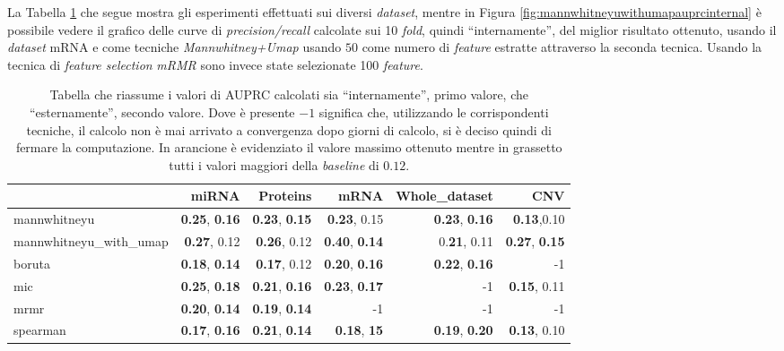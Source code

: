 \documentclass[12pt,italian]{report}
\begin{document}
	La Tabella \ref{firstExperiments} che segue mostra gli esperimenti effettuati sui diversi \textit{dataset}, mentre in Figura \ref{fig:mannwhitneyuwithumapauprcinternal} è possibile vedere il grafico delle curve di \textit{precision/recall} calcolate sui 10 \textit{fold}, quindi ``internamente'', del miglior risultato ottenuto, usando il \textit{dataset} mRNA e come tecniche \textit{Mannwhitney+Umap} usando $50$ come numero di \textit{feature} estratte attraverso la seconda tecnica. Usando la tecnica di \textit{feature selection} \textit{mRMR} sono invece state selezionate 100 \textit{feature}.
	
	\begin{table}[h]
		\begin{center}
			\begin{adjustbox}{max width=\textwidth}
				\begin{tabular}{lrrrrr}
					\toprule
					{} &    miRNA &  Proteins &  mRNA &  Whole\_dataset & CNV \\
					\midrule
					mannwhitneyu &  \textbf{0.25}, \textbf{0.16} & \textbf{0.23}, \textbf{0.15} & \textbf{0.23}, 0.15 & \textbf{0.23},\textbf{ 0.16} &\textbf{0.13},0.10 \\ 
					mannwhitneyu\_with\_umap  &  \textbf{0.27}, 0.12 & \textbf{0.26}, 0.12 &  \cellcolor{orange}\textbf{0.40}, \textbf{0.14} & 0.\textbf{21}, 0.11 &\textbf{0.27}, \textbf{0.15} \\
					boruta  & \textbf{0.18}, \textbf{0.14}& \textbf{0.17}, 0.12& \textbf{0.20}, \textbf{0.16} & \textbf{0.22}, \textbf{0.16} & -1\\
					mic  &  \textbf{0.25}, \textbf{0.18} &\textbf{0.21}, \textbf{0.16} &\textbf{0.23}, \textbf{0.17} & -1 & \textbf{0.15}, 0.11\\
					mrmr & \textbf{0.20}, \textbf{0.14} &  \textbf{0.19}, \textbf{0.14}  & -1 &  -1 & -1\\
					spearman &\textbf{0.17}, \textbf{0.16} & \textbf{0.21}, \textbf{0.14}& \textbf{0.18}, \textbf{15}& \textbf{0.19}, \textbf{0.20}& \textbf{0.13}, 0.10\\
					\bottomrule
				\end{tabular}
			\end{adjustbox}
		\end{center}
	\caption{Tabella che riassume i valori di AUPRC calcolati sia ``internamente'', primo valore, che ``esternamente'', secondo valore. Dove è presente $-1$ significa che, utilizzando le corrispondenti tecniche, il calcolo non è mai arrivato a convergenza dopo giorni di calcolo, si è deciso quindi di fermare la computazione. In arancione è evidenziato il valore massimo ottenuto mentre in grassetto tutti i valori maggiori della \textit{baseline} di $0.12$.}
	\label{firstExperiments}
	\end{table}
\end{document}
